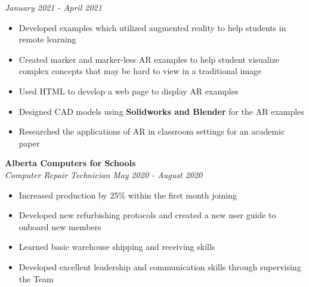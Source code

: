 \documentclass[a4paper,20pt]{article}
\begin{document}
        \textit{January 2021 - April 2021} \\
        \vspace{-18pt} 
        \hspace{-3pt}
        \begin{itemize}
            \item Developed examples which utilized augmented reality to help students in remote learning \vspace{-5pt}
            \item Created marker and marker-less AR examples to help student visualize complex concepts that may be hard to view in a traditional image \vspace{-5pt}
            \item Used HTML to develop a web page to display AR examples \vspace{-5pt}
            \item Designed CAD models using \textbf{Solidworks and Blender} for the AR examples  \vspace{-5pt}
            \item Researched the applications of AR in classroom settings for an academic paper
        \end{itemize}        

    \vspace{-1pt}
            \textbf{Alberta Computers for Schools}\hspace{3cm}
            \textit{}\\
            \textit{Computer Repair Technician}\hspace{9.9 cm}
            \textit{May 2020 - August 2020} \\
            \vspace{-18pt} 
            \hspace{-3pt}
            \begin{itemize}
                \item Increased production by 25\% within the first month joining \vspace{-5pt}
                \item Developed new refurbishing protocols and created a new user guide to onboard new members \vspace{-5pt}
                \item Learned basic warehouse shipping and receiving skills \vspace{-5pt}
                \item Developed excellent leadership and communication skills through supervising the Team 
            \end{itemize}    
\end{document}
